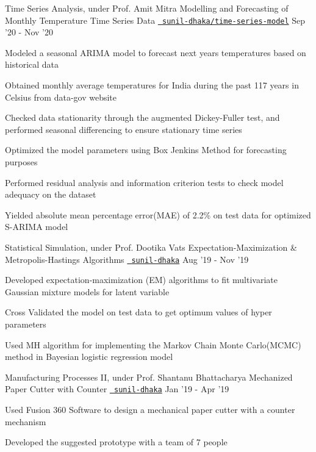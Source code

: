 \begin{cventries}
  \cventry
  {Time Series Analysis, under Prof. Amit Mitra}
  {Modelling and Forecasting of Monthly Temperature Time Series Data}
  {\texttt{\href{https://github.com/sunil-dhaka/time-series-model}{\faGithub{} sunil-dhaka/time-series-model}}}
  {Sep '20 - Nov '20}
  {
    \begin{cvitems}
      \item Modeled a seasonal ARIMA model to forecast next years temperatures based on historical data 
      \item Obtained monthly average temperatures for India during the past 117 years in Celsius from data-gov website
      \item Checked data stationarity through the augmented Dickey-Fuller test, and performed seasonal differencing to ensure stationary time series
      \item Optimized the model parameters using Box Jenkins Method for forecasting purposes
      \item Performed residual analysis and information criterion tests to check model adequacy on the dataset
      \item Yielded absolute mean percentage error(MAE) of 2.2\% on  test data for optimized S-ARIMA model  
    \end{cvitems}
  }

  \cventry
  {Statistical Simulation, under Prof. Dootika Vats}
  {Expectation-Maximization \& Metropolis-Hastings Algorithms}
  {\texttt{\href{https://github.com/sunil-dhaka/}{\faGithub{} sunil-dhaka}}}
  {Aug '19 - Nov '19}
  {
    \begin{cvitems}
      \item Developed expectation-maximization (EM) algorithms to fit multivariate Gaussian mixture models for latent variable 
	    \item Cross Validated the model on test data to get optimum values of hyper parameters
	    \item Used MH algorithm for implementing the Markov Chain Monte Carlo(MCMC) method in Bayesian logistic regression model
    \end{cvitems}
  }

  \cventry
  {Manufacturing Processes II, under Prof. Shantanu Bhattacharya}
  {Mechanized Paper Cutter with Counter}
  {\texttt{\href{https://github.com/sunil-dhaka/}{\faGithub{} sunil-dhaka}}}
  {Jan '19 - Apr '19}
  {
    \begin{cvitems}
      \item Used Fusion 360 Software to design a mechanical paper cutter with a counter mechanism
      \item Developed the suggested prototype with a team of 7 people
    \end{cvitems}
  }


\end{cventries}

